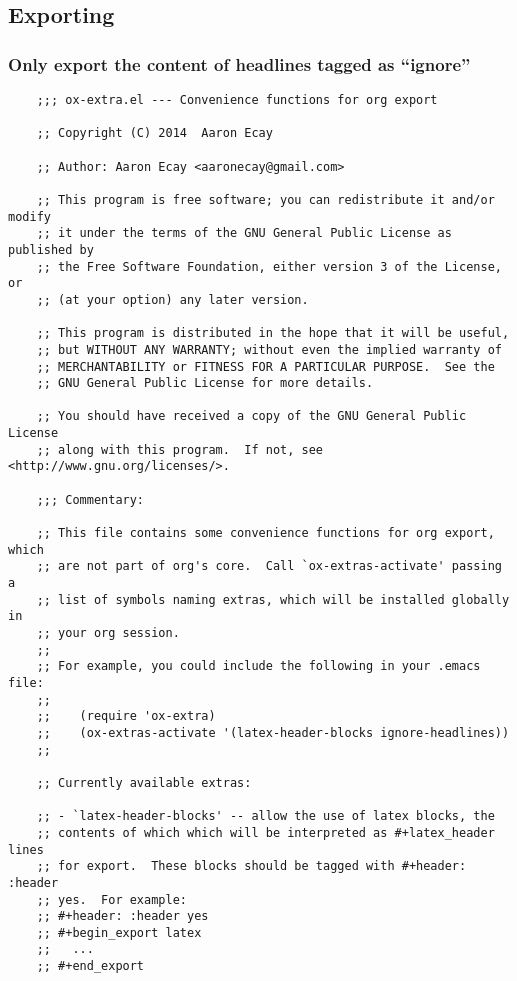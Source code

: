 \documentclass[11pt]{article}
\begin{document}
\subsection{Exporting}
\label{sec:orgb4cc177}

\subsubsection{Only export the content of headlines tagged as ``ignore''}
\label{sec:org8d90e74}
\begin{verbatim}
    ;;; ox-extra.el --- Convenience functions for org export

    ;; Copyright (C) 2014  Aaron Ecay

    ;; Author: Aaron Ecay <aaronecay@gmail.com>

    ;; This program is free software; you can redistribute it and/or modify
    ;; it under the terms of the GNU General Public License as published by
    ;; the Free Software Foundation, either version 3 of the License, or
    ;; (at your option) any later version.

    ;; This program is distributed in the hope that it will be useful,
    ;; but WITHOUT ANY WARRANTY; without even the implied warranty of
    ;; MERCHANTABILITY or FITNESS FOR A PARTICULAR PURPOSE.  See the
    ;; GNU General Public License for more details.

    ;; You should have received a copy of the GNU General Public License
    ;; along with this program.  If not, see <http://www.gnu.org/licenses/>.

    ;;; Commentary:

    ;; This file contains some convenience functions for org export, which
    ;; are not part of org's core.  Call `ox-extras-activate' passing a
    ;; list of symbols naming extras, which will be installed globally in
    ;; your org session.
    ;;
    ;; For example, you could include the following in your .emacs file:
    ;;
    ;;    (require 'ox-extra)
    ;;    (ox-extras-activate '(latex-header-blocks ignore-headlines))
    ;;

    ;; Currently available extras:

    ;; - `latex-header-blocks' -- allow the use of latex blocks, the
    ;; contents of which which will be interpreted as #+latex_header lines
    ;; for export.  These blocks should be tagged with #+header: :header
    ;; yes.  For example:
    ;; #+header: :header yes
    ;; #+begin_export latex
    ;;   ...
    ;; #+end_export


\end{verbatim}
\end{document}

